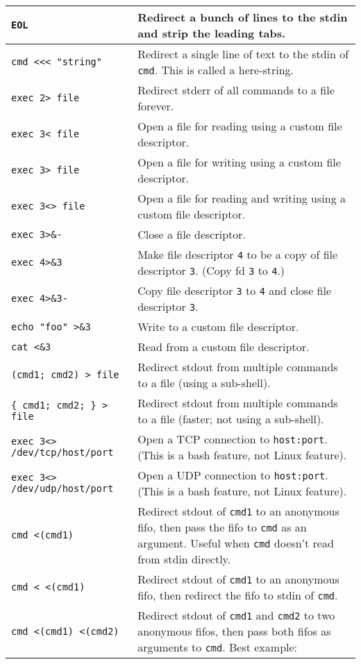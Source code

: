 \documentclass[9pt]{memoir}
\begin{document}
\begin{tabular}{|m{5.5cm}|m{12.2cm}|}
{\verb|EOL|
} & Redirect a bunch of lines to the stdin and strip the leading tabs. \\
\hline
\verb|cmd <<< "string"| & Redirect a single line of text to the stdin of \verb|cmd|. This is called a here-string. \\
\hline
\verb|exec 2> file| & Redirect stderr of all commands to a file forever. \\
\hline
\verb|exec 3< file| & Open a file for reading using a custom file descriptor. \\
\hline
\verb|exec 3> file| & Open a file for writing using a custom file descriptor. \\
\hline
\verb|exec 3<> file| & Open a file for reading and writing using a custom file descriptor. \\
\hline
\verb|exec 3>&-| & Close a file descriptor. \\
\hline
\verb|exec 4>&3| & Make file descriptor \verb|4| to be a copy of file descriptor \verb|3|. (Copy fd \verb|3| to \verb|4|.) \\
\hline
\verb|exec 4>&3-| & Copy file descriptor \verb|3| to \verb|4| and close file descriptor \verb|3|. \\
\hline
\verb|echo "foo" >&3| & Write to a custom file descriptor. \\
\hline
\verb|cat <&3| & Read from a custom file descriptor. \\
\hline
\verb|(cmd1; cmd2) > file| & Redirect stdout from multiple commands to a file (using a sub-shell). \\
\hline
\verb|{ cmd1; cmd2; } > file| & Redirect stdout from multiple commands to a file (faster; not using a sub-shell). \\
\hline
\verb|exec 3<> /dev/tcp/host/port| & Open a TCP connection to \verb|host:port|. (This is a bash feature, not Linux feature). \\
\hline
\verb|exec 3<> /dev/udp/host/port| & Open a UDP connection to \verb|host:port|. (This is a bash feature, not Linux feature). \\
\hline
\verb|cmd <(cmd1)| & Redirect stdout of \verb|cmd1| to an anonymous fifo, then pass the fifo to \verb|cmd| as an argument. Useful when \verb|cmd| doesn't read from stdin directly. \\
\hline
\verb|cmd < <(cmd1)| & Redirect stdout of \verb|cmd1| to an anonymous fifo, then redirect the fifo to stdin of \verb|cmd|. \\
\hline
\verb|cmd <(cmd1) <(cmd2) | & Redirect stdout of \verb|cmd1| and \verb|cmd2| to two anonymous fifos, then pass both fifos as arguments to \verb|cmd|.  Best example: \verb\diff <(find /path1 | sort) <(find /path2 | sort)\. \\

\end{tabular}
\end{document}
